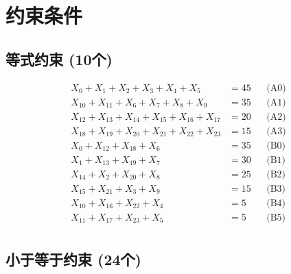 \documentclass[a4paper,10pt]{article}
\begin{document}
\section{约束条件}

\subsection{等式约束 (10个)}

\allowdisplaybreaks
{\small\begin{align}
X_{0} + X_{1} + X_{2} + X_{3} + X_{4} + X_{5} &= 45 && \text{(A0)} \\
X_{10} + X_{11} + X_{6} + X_{7} + X_{8} + X_{9} &= 35 && \text{(A1)} \\
X_{12} + X_{13} + X_{14} + X_{15} + X_{16} + X_{17} &= 20 && \text{(A2)} \\
X_{18} + X_{19} + X_{20} + X_{21} + X_{22} + X_{23} &= 15 && \text{(A3)} \\
X_{0} + X_{12} + X_{18} + X_{6} &= 35 && \text{(B0)} \\
X_{1} + X_{13} + X_{19} + X_{7} &= 30 && \text{(B1)} \\
X_{14} + X_{2} + X_{20} + X_{8} &= 25 && \text{(B2)} \\
X_{15} + X_{21} + X_{3} + X_{9} &= 15 && \text{(B3)} \\
X_{10} + X_{16} + X_{22} + X_{4} &= 5 && \text{(B4)} \\
X_{11} + X_{17} + X_{23} + X_{5} &= 5 && \text{(B5)} \\
\end{align}}

\subsection{小于等于约束 (24个)}
\end{document}
